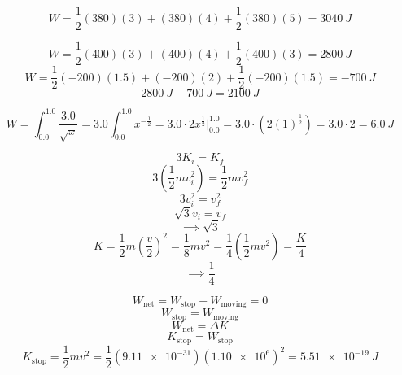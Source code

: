 \documentclass[11pt]{homework}
\begin{document}
\setcounter{questionCounter}{38}
\question



\[
    W = \frac{1}{2}(380)(3) + (380)(4) + \frac{1}{2}(380)(5) = \boxed{\qty{3040}{J}}
\]

\setcounter{questionCounter}{40}
\question
\begin{alphaparts}
\questionpart
\[
    W = \frac{1}{2}(400)(3) + (400)(4) + \frac{1}{2}(400)(3) = \boxed{\qty{2800}{J}}
\]
\questionpart
\[
    W = \frac{1}{2}(-200)(1.5) + (-200)(2) + \frac{1}{2}(-200)(1.5) = \qty{-700}{J}
\]
\[
    \qty{2800}{J} - \qty{700}{J} = \boxed{\qty{2100}{J}}
\]
\end{alphaparts}

\setcounter{questionCounter}{44}
\question
\[
    W = \int_{0.0}^{1.0}\frac{3.0}{\sqrt{x}}=3.0 \int_{0.0}^{1.0}x^{-\frac{1}{2}}=3.0 \cdot 2x^{\frac{1}{2}}\Big|_{0.0}^{1.0} = 3.0 \cdot (2(1)^{\frac{1}{2}}) = 3.0 \cdot 2 = \boxed{\qty{6.0}{J}}
\]

\setcounter{questionCounter}{54}
\question
\begin{alphaparts}
\questionpart
\[
    3K_i = K_f
\]
\[
    3(\frac{1}{2}mv_i^2) = \frac{1}{2}mv_f^{2}  
\]
\[
    3v_i^2 = v_f^2 
\]
\[
    \sqrt{3}v_i = v_f
\]
\[
    \implies \boxed{\sqrt{3}}
\]
\questionpart
\[
    K=\frac{1}{2}m\left(\frac{v}{2}\right)^2 = \frac{1}{8}mv^2=\frac{1}{4}\left(\frac{1}{2}mv^2\right) = \frac{K}{4}
\]\[
\implies \boxed{\frac{1}{4}}
\]
\end{alphaparts}

\question
\[
W_{\text{net}}= W_{\text{stop}} - W_{\text{moving}} = 0
\]\[
W_{\text{stop}} = W_{\text{moving}}
\]\[
W_{\text{net}} = \Delta K
\]
\[
K_{\text{stop}} = W_{\text{stop}}
\]\[
K_{\text{stop}} = \frac{1}{2}mv^2 = \frac{1}{2}(\qty{9.11e-31})(\qty{1.10e6})^2 = \boxed{\qty{5.51e-19}{J}}
\]
\end{document}
